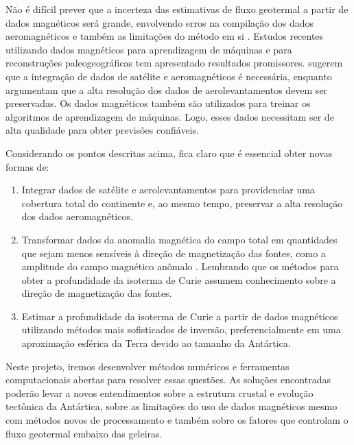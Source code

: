 \documentclass[12pt,a4paper,oneside]{book}
\begin{document}
Não é difícil prever que a incerteza das estimativas de fluxo geotermal a
partir de dados magnéticos será grande, envolvendo erros na compilação dos
dados aeromagnéticos e também as limitações do método em si
\citep{BurtonJohnson2020}.
Estudos recentes utilizando dados magnéticos para aprendizagem de máquinas
\citep{Losing2021} e para reconstruções paleogeográficas \citep{Ebbing2021} tem
apresentado resultados promissores.
\citet{Ebbing2021} sugerem que a integração de dados de satélite e
aeromagnéticos é necessária, enquanto \citet{Lowe2023} argumentam que a alta
resolução dos dados de aerolevantamentos devem ser preservadas.
Os dados magnéticos também são utilizados para treinar os algoritmos de
aprendizagem de máquinas.
Logo, esses dados necessitam ser de alta qualidade para obter previsões
confiáveis.

Considerando os pontos descritas acima, fica claro que é essencial obter novas
formas de:

\begin{enumerate}
  \item Integrar dados de satélite e aerolevantamentos para providenciar uma
    cobertura total do continente e, ao mesmo tempo, preservar a alta resolução
    dos dados aeromagnéticos.
  \item Transformar dados da anomalia magnética do campo total em quantidades
    que sejam menos sensíveis à direção de magnetização das fontes, como a
    amplitude do campo magnético anômalo \citep{Melo2021}. Lembrando que os
    métodos para obter a profundidade da isoterma de Curie assumem conhecimento
    sobre a direção de magnetização das fontes.
  \item Estimar a profundidade da isoterma de Curie a partir de dados
    magnéticos utilizando métodos mais sofisticados de inversão,
    preferencialmente em uma aproximação esférica da Terra devido ao tamanho da
    Antártica.
\end{enumerate}

\noindent
Neste projeto, iremos desenvolver métodos numéricos e ferramentas
computacionais abertas para resolver essas questões.
As soluções encontradas poderão levar a novos entendimentos sobre a estrutura
crustal e evolução tectônica da Antártica, sobre as limitações do uso de dados
magnéticos mesmo com métodos novos de processamento e também sobre os fatores
que controlam o fluxo geotermal embaixo das geleiras.
\end{document}
